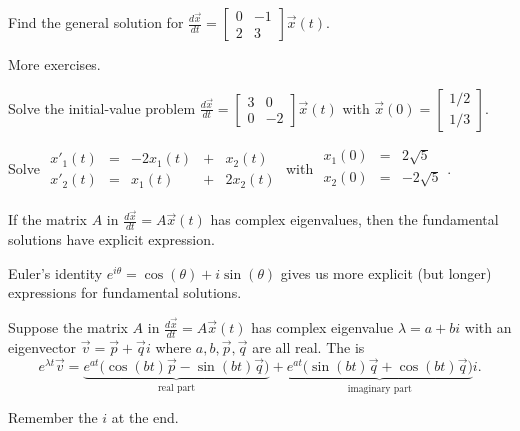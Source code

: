 \documentclass[../main.tex]{subfiles}
\begin{document}
\begin{example}
  Find the general solution for \( \frac{d\vec{x}}{dt} = \begin{bmatrix} 0 & -1  \\ 2 & 3 \end{bmatrix} \vec{x}(t) \).

\end{example}


\clearpage
More exercises.

\begin{example}
  Solve the initial-value problem \( \frac{d\vec{x}}{dt} = \begin{bmatrix} 3 & 0  \\ 0 & -2 \end{bmatrix} \vec{x}(t) \) with \(\vec{x}(0) = \begin{bmatrix} 1/2 \\ 1/3 \end{bmatrix}\).
\end{example}
\clearpage

\begin{example}
  Solve 
  \(
  \begin{array}{rcrcr}
    x'_{1}(t) &=& -2 x_{1}(t) &+&  x_{2}(t) \\
    x'_{2}(t) &=&    x_{1}(t) &+& 2x_{2}(t)
  \end{array}
  \) with \(
  \begin{array}{rcr}
    x_{1}(0) &=&  2 \sqrt{5} \\
    x_{2}(0) &=& -2 \sqrt{5} \\
  \end{array}
  \).

\end{example}
\clearpage

If the matrix \(A\) in \(\frac{d\vec{x}}{dt} = A \vec{x}(t)\) has complex eigenvalues, then the fundamental solutions have explicit expression. 

\begin{definition}
  Euler's identity \(e^{i \theta} = \cos(\theta) + i \sin(\theta)\) gives us more explicit (but longer) expressions for fundamental solutions. 

  Suppose the matrix \(A\) in \(\frac{d\vec{x}}{dt} = A \vec{x}(t)\) has complex eigenvalue \(\lambda = a + bi\) with an eigenvector \(\vec{v} = \vec{p} + \vec{q}i\) where \(a,b,\vec{p},\vec{q}\) are all real. The  is
  \[
    e^{\lambda t} \vec{v} = \underbrace{e^{at} \bigg( \cos(bt) \vec{p} - \sin(bt) \vec{q} \bigg)}_{\text{real part}} +  \underbrace{e^{at} \bigg( \sin(bt) \vec{q} + \cos(bt) \vec{q}\bigg)}_{\text{imaginary part}} i.
  \]

  Remember the \(i\) at the end.
\end{definition}
\end{document}
